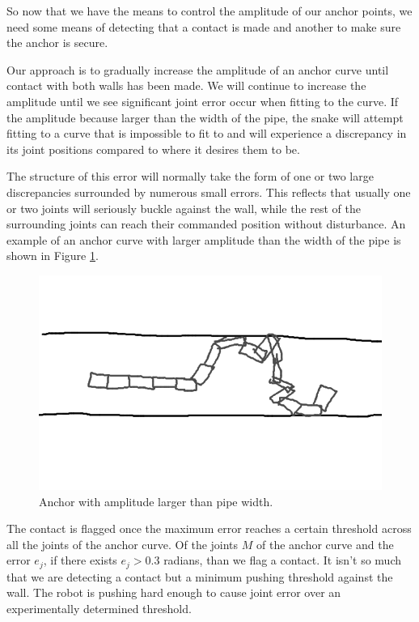So now that we have the means to control the amplitude of our anchor points, we need some means of detecting that a contact is made and another to make sure the anchor is secure. 

Our approach is to gradually increase the amplitude of an anchor curve until contact with both walls has been made.  We will continue to increase the amplitude until we see significant joint error occur when fitting to the curve.  If the amplitude because larger than the width of the pipe, the snake will attempt fitting to a curve that is impossible to fit to and will experience a discrepancy in its joint positions compared to where it desires them to be.

The structure of this error will normally take the form of one or two large discrepancies surrounded by numerous small errors.  This reflects that usually one or two joints will seriously buckle against the wall, while the rest of the surrounding joints can reach their commanded position without disturbance.  An example of an anchor curve with larger amplitude than the width of the pipe is shown in Figure \ref{anchor2}.

\begin{figure}
\begin{center}
\includegraphics[scale=0.5]{2_anchoring_2.png}
\end{center}
\caption{Anchor with amplitude larger than pipe width.}
\label{anchor2}
\end{figure}

The contact is flagged once the maximum error reaches a certain threshold across all the joints of the anchor curve.  Of the joints $M$ of the anchor curve and the error $e_j$, if there exists $e_j > 0.3$ radians, than we flag a contact.  It isn’t so much that we are detecting a contact but a minimum pushing threshold against the wall.  The robot is pushing hard enough to cause joint error over an experimentally determined threshold.

